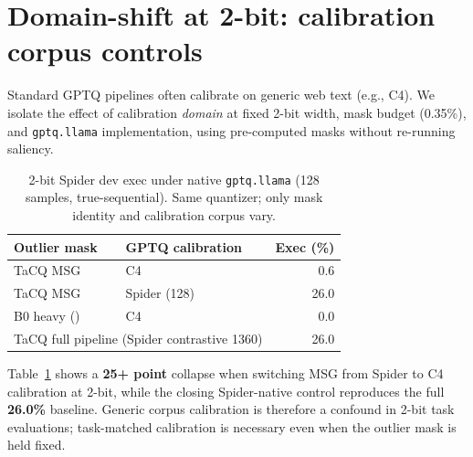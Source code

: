 \section{Domain-shift at 2-bit: calibration corpus controls}
\label{sec:domain-shift}

Standard GPTQ pipelines often calibrate on generic web text (e.g., C4).
We isolate the effect of calibration \emph{domain} at fixed 2-bit width, mask budget (0.35\%),
and \texttt{gptq.llama} implementation, using pre-computed masks without re-running saliency.

\begin{table}[t]
  \centering
  \caption{2-bit Spider dev exec under native \texttt{gptq.llama} (128 samples, true-sequential).
  Same quantizer; only mask identity and calibration corpus vary.}
  \label{tab:domain-shift}
  \small
  \begin{tabular}{llr}
    \toprule
    Outlier mask & GPTQ calibration & Exec (\%) \\
    \midrule
    TaCQ MSG & C4 & 0.6 \\
    TaCQ MSG & Spider (128) & 26.0 \\
    B0 heavy (\method{}) & C4 & 0.0 \\
    \midrule
    \multicolumn{2}{l}{TaCQ full pipeline (Spider contrastive 1360)} & 26.0 \\
    \bottomrule
  \end{tabular}
\end{table}

Table~\ref{tab:domain-shift} shows a \textbf{25+ point} collapse when switching MSG from Spider to
C4 calibration at 2-bit, while the closing Spider-native control reproduces the full \baseline{}
\textbf{26.0\%} baseline.
Generic corpus calibration is therefore a confound in 2-bit task evaluations; task-matched
calibration is necessary even when the outlier mask is held fixed.
